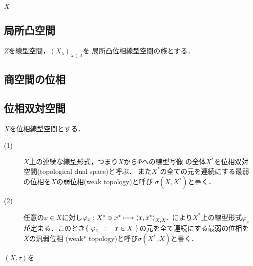 	\begin{screen}
		\begin{thm}
			
		\end{thm}
	\end{screen}
	
	\begin{screen}
		\begin{thm}[開写像原理]
			$X$
		\end{thm}
	\end{screen}

\subsection{局所凸空間}
	\begin{screen}
		\begin{lem}
			$Z$を線型空間，$(X_\lambda)_{\lambda \in \Lambda}$を
			局所凸位相線型空間の族とする．
		\end{lem}
	\end{screen}
	
	\begin{screen}
		\begin{thm}[局所凸空間とはセミノルムの族で生成される空間]
			
		\end{thm}
	\end{screen}
	
\subsection{商空間の位相}

\subsection{位相双対空間}
	\begin{screen}
		\begin{dfn}
			$X$を位相線型空間とする．
			\begin{description}
				\item[(1)] $X$上の連続な線型形式，つまり$X$から$\Phi$への線型写像
					の全体$X^*$を位相双対空間(topological dual space)と呼ぶ．
					また$X^*$の全ての元を連続にする最弱の位相を$X$の弱位相(weak topology)と呼び
					$\sigma(X,X^*)$と書く．
				
				\item[(2)] 任意の$x \in X$に対し$\varphi_x:X^* \ni x^* \longmapsto \inprod<x,x^*>_{X,X^*}$
					により$X^*$上の線型形式$\varphi_x$が定まる．このとき$\left\{\ \varphi_x\ \, : \quad x \in X\ \right\}$の元を全て連続にする最弱の位相を$X$の汎弱位相
					(weak$\ast$ topology)と呼び$\sigma(X^*,X)$と書く．
			\end{description}
		\end{dfn}
	\end{screen}
	
	\begin{screen}
		\begin{thm}
		\end{thm}
	\end{screen}
	
	\begin{screen}
		\begin{thm}[位相的双対空間の全ての元を連続にする最弱の位相は局所凸線型位相]
			$(X,\tau)$を
		\end{thm}
	\end{screen}